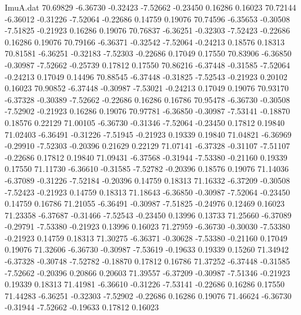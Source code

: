 \begin{filecontents}{ImuA.dat}
  70.69829   -6.36730   -0.32423   -7.52662   -0.23450    0.16286    0.16023
  70.72144   -6.36012   -0.31226   -7.52064   -0.22686    0.14759    0.19076
  70.74596   -6.35653   -0.30508   -7.51825   -0.21923    0.16286    0.19076
  70.76837   -6.36251   -0.32303   -7.52423   -0.22686    0.16286    0.19076
  70.79166   -6.36371   -0.32542   -7.52064   -0.24213    0.18576    0.18313
  70.81581   -6.36251   -0.32183   -7.52303   -0.22686    0.17049    0.17550
  70.83906   -6.36850   -0.30987   -7.52662   -0.25739    0.17812    0.17550
  70.86216   -6.37448   -0.31585   -7.52064   -0.24213    0.17049    0.14496
  70.88545   -6.37448   -0.31825   -7.52543   -0.21923    0.20102    0.16023
  70.90852   -6.37448   -0.30987   -7.53021   -0.24213    0.17049    0.19076
  70.93170   -6.37328   -0.30389   -7.52662   -0.22686    0.16286    0.16786
  70.95478   -6.36730   -0.30508   -7.52902   -0.21923    0.16286    0.19076
  70.97781   -6.36850   -0.30987   -7.53141   -0.18870    0.18576    0.22129
  71.00105   -6.36730   -0.31346   -7.52064   -0.23450    0.17812    0.19840
  71.02403   -6.36491   -0.31226   -7.51945   -0.21923    0.19339    0.19840
  71.04821   -6.36969   -0.29910   -7.52303   -0.20396    0.21629    0.22129
  71.07141   -6.37328   -0.31107   -7.51107   -0.22686    0.17812    0.19840
  71.09431   -6.37568   -0.31944   -7.53380   -0.21160    0.19339    0.17550
  71.11730   -6.36610   -0.31585   -7.52782   -0.20396    0.18576    0.19076
  71.14036   -6.37089   -0.31226   -7.52184   -0.20396    0.14759    0.18313
  71.16332   -6.37209   -0.30508   -7.52423   -0.21923    0.14759    0.18313
  71.18643   -6.36850   -0.30987   -7.52064   -0.23450    0.14759    0.16786
  71.21055   -6.36491   -0.30987   -7.51825   -0.24976    0.12469    0.16023
  71.23358   -6.37687   -0.31466   -7.52543   -0.23450    0.13996    0.13733
  71.25660   -6.37089   -0.29791   -7.53380   -0.21923    0.13996    0.16023
  71.27959   -6.36730   -0.30030   -7.53380   -0.21923    0.14759    0.18313
  71.30275   -6.36371   -0.30628   -7.53380   -0.21160    0.17049    0.19076
  71.32606   -6.36730   -0.30987   -7.53619   -0.19633    0.19339    0.15260
  71.34942   -6.37328   -0.30748   -7.52782   -0.18870    0.17812    0.16786
  71.37252   -6.37448   -0.31585   -7.52662   -0.20396    0.20866    0.20603
  71.39557   -6.37209   -0.30987   -7.51346   -0.21923    0.19339    0.18313
  71.41981   -6.36610   -0.31226   -7.53141   -0.22686    0.16286    0.17550
  71.44283   -6.36251   -0.32303   -7.52902   -0.22686    0.16286    0.19076
  71.46624   -6.36730   -0.31944   -7.52662   -0.19633    0.17812    0.16023

\end{filecontents}
